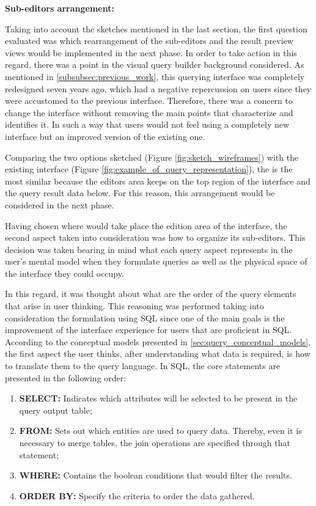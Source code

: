 \medskip

\textbf{Sub-editors arrangement:}

\medskip

Taking into account the sketches mentioned in the last section, the first question evaluated was which rearrangement of the sub-editors and the result preview views would be implemented in the next phase. In order to take action in this regard, there was a point in the visual query builder background considered. As mentioned in \ref{subsubsec:previous_work}, this querying interface was completely redesigned seven years ago, which had a negative repercussion on users since they were accustomed to the previous interface. Therefore, there was a concern to change the interface without removing the main points that characterize and identifies it. In such a way that users would not feel using a completely new interface but an improved version of the existing one.

Comparing the two options sketched (Figure \ref{fig:sketch_wireframes}) with the existing interface (Figure \ref{fig:example_of_query_representation}), the  is the most similar because the editors area keeps on the top region of the interface and the query result data below. For this reason, this arrangement would be considered in the next phase.

Having chosen where would take place the edition area of the interface, the second aspect taken into consideration was how to organize its sub-editors. This decision was taken bearing in mind what each query aspect represents in the user's mental model when they formulate queries as well as the physical space of the interface they could occupy.

In this regard, it was thought about what are the order of the query elements that arise in user thinking. This reasoning was performed taking into consideration the formulation using \gls{SQL} since one of the main goals is the improvement of the interface experience for users that are proficient in \gls{SQL}. According to the conceptual models presented in \ref{sec:query_conceptual_models}, the first aspect the user thinks, after understanding what data is required, is how to translate them to the query language. In \gls{SQL}, the core statements are presented in the following order:

\begin{enumerate}
  \item \textbf{SELECT: }Indicates which attributes will be selected to be present in the query output table;
  \item \textbf{FROM: }Sets out which entities are used to query data. Thereby, even it is necessary to merge tables, the join operations are specified through that statement;
  \item \textbf{WHERE: }Contains the boolean conditions that would filter the results.
  \item \textbf{ORDER BY: }Specify the criteria to order the data gathered.
\end{enumerate}


